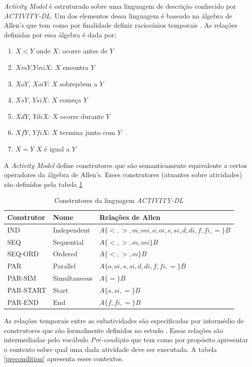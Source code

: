 \textit{Activity Model} é estruturado sobre uma linguagem de descrição conhecido por \textit{ACTIVITY-DL}. Um dos elementos dessa linguagem é baseado na álgebra de Allen's que tem como por finalidade definir raciocínios temporais \cite{allenalgebric}. 
As relações definidas por essa álgebra é dada por; 

\begin{enumerate}
	\item $X < Y$ onde $X$: ocorre antes de $Y$ 
	\item $X m Y$,$Y mi X$: $X$ encontra $Y$
	\item $X o Y$, $X oi Y$: $X$ sobrepõem a $Y$
	\item $X s Y$, $Y si X$: $X$ começa $Y$
	\item $X d Y$, $Y di X$: $X$ ocorre durante $Y$	  
	\item $X f Y$, $Y fi X$: $X$ termina junto com $Y$	  	
	\item $X = Y$ $X$ é igual a $Y$	  		
\end{enumerate}

A \textit{Activity Model} define construtores que são semanticamente equivalente a certos operadores da álgebra de Allen's. Esses construtores (atuantes sobre atividades) são definidos pela tabela \ref{acticonstruct}

\begin{table}[H]
\centering
\begin{tabular}{|l|l|l|}
\hline
Construtor & Nome         & Relações de Allen \\ \hline
IND        & Independent  & $A \{ <,>,m,mi,o,oi,s,si,d,di,f,fi,= \} B$\\ \hline
SEQ        & Sequential   & $A \{ <,>,m,mi \} B$\\ \hline
SEQ-ORD    & Ordered      & $A \{ <,>,m \} B$\\ \hline
PAR        & Parallel     & $A \{ o,oi,s,si,d,di,f,fi,= \} B$ \\ \hline
PAR-SIM    & Simultaneous & $A \{ = \} B$\\ \hline
PAR-START  & Start        & $A \{ s,si,= \} B$\\ \hline
PAR-END    & End          & $A \{ f,fi,= \} B$ \\ \hline
\end{tabular}
\caption{Construtores da linguagem \textit{ACTIVITY-DL} \cite{v3sframework}}
\label{acticonstruct}
\end{table}

As relações temporais entre as subatividades são especificadas por intermédio de construtores que são formalmente definidos no estudo \cite{allenalgebric}. 
Essas relações são intermediadas pelo vocábulo \textit{Pré-condição} que tem como por propósito apresentar o contexto sobre qual uma dada atividade deve ser executada. 
A tabela \ref{precondition} apresenta esses contextos.

